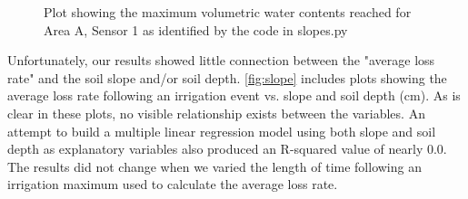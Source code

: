 \documentclass[12pt]{scrartcl}
\begin{document}
\begin{figure}[!htb]
        \caption{\label{fig:irrigation-max} Plot showing the maximum volumetric water contents reached for Area A, Sensor 1 as identified by the code in slopes.py}
\end{figure}

Unfortunately, our results showed little connection between the "average loss rate" and the soil slope and/or soil depth. \autoref{fig:slope} includes plots showing the average loss rate following an irrigation event vs. slope and soil depth (cm). As is clear in these plots, no visible relationship exists between the variables. An attempt to build a multiple linear regression model using both slope and soil depth as explanatory variables also produced an R-squared value of nearly 0.0. The results did not change when we varied the length of time following an irrigation maximum used to calculate the average loss rate.
\end{document}
